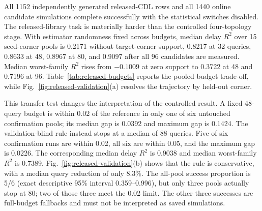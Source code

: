 \documentclass[preprint,12pt]{elsarticle}
\begin{document}
All 1152 independently generated released-CDL rows and all 1440 online candidate simulations complete successfully with the statistical switches disabled. The released-library task is materially harder than the controlled four-topology stage. With estimator randomness fixed across budgets, median delay $R^2$ over 15 seed-corner pools is 0.2171 without target-corner support, 0.8217 at 32 queries, 0.8633 at 48, 0.8967 at 80, and 0.9097 after all 96 candidates are measured. Median worst-family $R^2$ rises from $-0.1009$ at zero support to 0.3722 at 48 and 0.7196 at 96. Table~\ref{tab:released-budgets} reports the pooled budget trade-off, while Fig.~\ref{fig:released-validation}(a) resolves the trajectory by held-out corner.

\begin{table}[t]
\centering
\caption{Released-CDL external-validation budgets over 15 seed-corner pools. Values are pooled medians.}
\label{tab:released-budgets}
\end{table}

This transfer test changes the interpretation of the controlled result. A fixed 48-query budget is within 0.02 of the reference in only one of six untouched confirmation pools; its median gap is 0.0392 and maximum gap is 0.1424. The validation-blind rule instead stops at a median of 88 queries. Five of six confirmation runs are within 0.02, all six are within 0.05, and the maximum gap is 0.0226. The corresponding median delay $R^2$ is 0.9038 and median worst-family $R^2$ is 0.7389. Fig.~\ref{fig:released-validation}(b) shows that the rule is conservative, with a median query reduction of only 8.3\%. The all-pool success proportion is 5/6 (exact descriptive 95\% interval 0.359--0.996), but only three pools actually stop at 80; two of those three meet the 0.02 limit. The other three successes are full-budget fallbacks and must not be interpreted as saved simulations.
\end{document}
